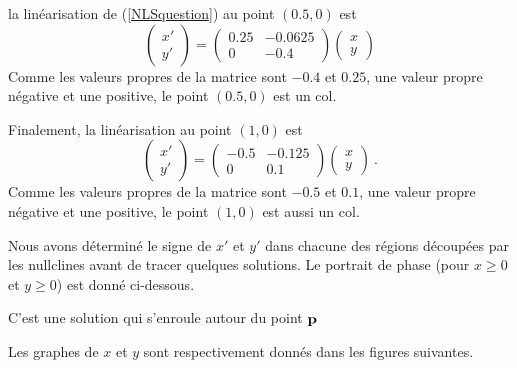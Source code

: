 {la linéarisation de (\ref{NLSquestion}) au point $(0.5,0)$ est
\[
\begin{pmatrix} x'\\ y' \end{pmatrix} =
\begin{pmatrix} 0.25 & -0.0625 \\ 0 & -0.4 \end{pmatrix}
\begin{pmatrix} x \\ y \end{pmatrix}
\]
Comme les valeurs propres de la matrice sont $-0.4$ et $0.25$, une valeur
propre négative et une positive, le point $(0.5,0)$ est un col.

Finalement, la linéarisation au point $(1,0)$ est
\[
\begin{pmatrix} x'\\ y' \end{pmatrix} =
\begin{pmatrix} -0.5 & -0.125 \\ 0 & 0.1 \end{pmatrix}
\begin{pmatrix} x \\ y \end{pmatrix} \ .
\]
Comme les valeurs propres de la matrice sont $-0.5$ et $0.1$, une valeur
propre négative et une positive, le point $(1,0)$ est aussi un col.

Nous avons déterminé le signe de $x'$ et $y'$ dans chacune des régions découpées
par les nullclines avant de tracer quelques solutions.  Le portrait de phase
(pour $x\geq 0$ et $y\geq 0$) est donné ci-dessous.

 C'est une solution qui s'enroule autour du point $\mathbf{p}$

 Les graphes de $x$ et $y$ sont respectivement donnés dans les
figures suivantes.

}
